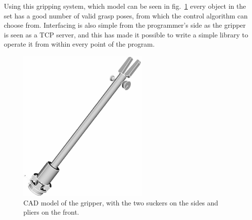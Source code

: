 Using this gripping system, which model can be seen in fig.~\ref{fig:gripper}
every object in the set has a good number of valid grasp poses, from which the
control algorithm can choose from. Interfacing is also simple from the
programmer's side as the gripper is seen as a TCP server, and this has made it
possible to write a simple library to operate it from within every point of the
program.

\begin{figure}[htbp]
  \centering
  \includegraphics[height=3in]{./Graphics/gripper}
  \caption{CAD model of the gripper, with the two suckers on the sides and
  pliers on the front. \label{fig:gripper}}
\end{figure}

